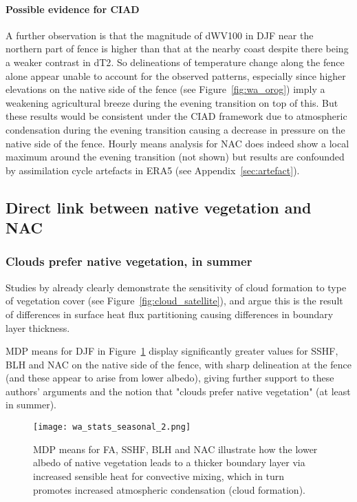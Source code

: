 \paragraph{Possible evidence for CIAD}

A further observation is that the magnitude of \ac{dWV100} in \ac{DJF} near the northern part of fence is higher than that at the nearby coast despite there being a weaker contrast in \ac{dT2}. So delineations of temperature change along the fence alone appear unable to account for the observed patterns, especially since higher elevations on the native side of the fence (see Figure~\ref{fig:wa_orog}) imply a weakening agricultural breeze during the evening transition on top of this. But these results would be consistent under the \ac{CIAD} framework due to atmospheric condensation during the evening transition causing a decrease in pressure on the native side of the fence. Hourly means analysis for \ac{NAC} does indeed show a local maximum around the  evening transition (not shown) but results are confounded by assimilation cycle artefacts in \ac{ERA5} (see Appendix~\ref{sec:artefact}).

\subsection{Direct link between native vegetation and NAC}
\label{ssec:native_nac}

\subsubsection{Clouds prefer native vegetation, in summer}

Studies by \citet{lyons1993, lyons1996, lyons2002, ray2003, nair2011} already clearly demonstrate the sensitivity of cloud formation to type of vegetation cover (see Figure~\ref{fig:cloud_satellite}), and argue this is the result of differences in surface heat flux partitioning causing differences in boundary layer thickness.

\ac{MDP} means for \ac{DJF} in Figure~\ref{fig:wa_stats_seasonal_2} display significantly greater values for \ac{SSHF}, \ac{BLH} and \ac{NAC} on the native side of the fence, with sharp delineation at the fence (and these appear to arise from lower albedo), giving further support to these authors' arguments and the notion that "clouds prefer native vegetation" \citep{lyons2002} (at least in summer).

\begin{figure}[!htp]
	\centering
	\texttt{[image: wa\_stats\_seasonal\_2.png]}
	\caption[Selected MDP means with fence delineations]{\acs{MDP} means for \acs{FA}, \acs{SSHF}, \acs{BLH} and \acs{NAC} illustrate how the lower albedo of native vegetation leads to a thicker boundary layer via increased sensible heat for convective mixing, which in turn promotes increased atmospheric condensation (cloud formation).}
	\label{fig:wa_stats_seasonal_2}
\end{figure}

